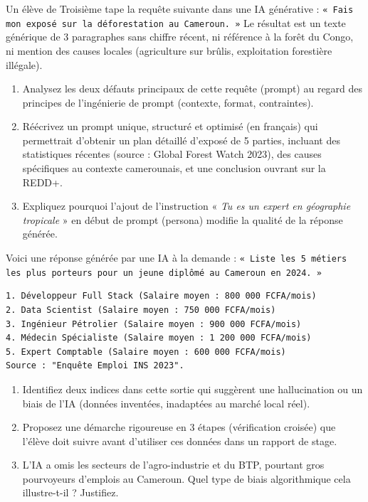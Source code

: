 \documentclass[11pt]{article}
\begin{document}
\begin{exercice}
Un élève de Troisième tape la requête suivante dans une IA générative : \texttt{« Fais mon exposé sur la déforestation au Cameroun. »} Le résultat est un texte générique de 3 paragraphes sans chiffre récent, ni référence à la forêt du Congo, ni mention des causes locales (agriculture sur brûlis, exploitation forestière illégale).

\begin{enumerate}
    \item Analysez les deux défauts principaux de cette requête (prompt) au regard des principes de l'ingénierie de prompt (contexte, format, contraintes).
    \item Réécrivez un prompt unique, structuré et optimisé (en français) qui permettrait d'obtenir un plan détaillé d'exposé de 5 parties, incluant des statistiques récentes (source : Global Forest Watch 2023), des causes spécifiques au contexte camerounais, et une conclusion ouvrant sur la REDD+.
    \item Expliquez pourquoi l'ajout de l'instruction « \textit{Tu es un expert en géographie tropicale} » en début de prompt (persona) modifie la qualité de la réponse générée.
\end{enumerate}
\end{exercice}

\begin{exercice}
Voici une réponse générée par une IA à la demande : \texttt{« Liste les 5 métiers les plus porteurs pour un jeune diplômé au Cameroun en 2024. »}

\begin{verbatim}
1. Développeur Full Stack (Salaire moyen : 800 000 FCFA/mois)
2. Data Scientist (Salaire moyen : 750 000 FCFA/mois)
3. Ingénieur Pétrolier (Salaire moyen : 900 000 FCFA/mois)
4. Médecin Spécialiste (Salaire moyen : 1 200 000 FCFA/mois)
5. Expert Comptable (Salaire moyen : 600 000 FCFA/mois)
Source : "Enquête Emploi INS 2023".
\end{verbatim}

\begin{enumerate}
    \item Identifiez deux indices dans cette sortie qui suggèrent une hallucination ou un biais de l'IA (données inventées, inadaptées au marché local réel).
    \item Proposez une démarche rigoureuse en 3 étapes (vérification croisée) que l'élève doit suivre avant d'utiliser ces données dans un rapport de stage.
    \item L'IA a omis les secteurs de l'agro-industrie et du BTP, pourtant gros pourvoyeurs d'emplois au Cameroun. Quel type de biais algorithmique cela illustre-t-il ? Justifiez.
\end{enumerate}
\end{exercice}
\end{document}
